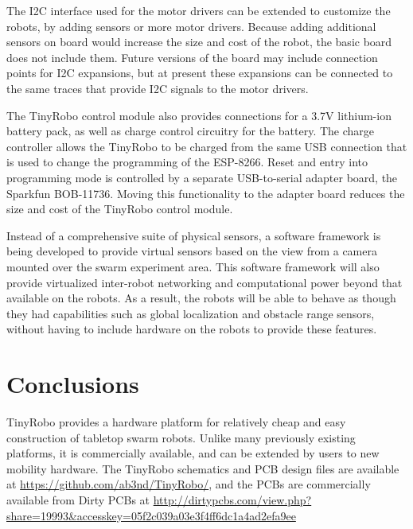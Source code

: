 \documentclass[letterpaper, 10 pt, conference]{ieeeconf}  %
\begin{document}
The I2C interface used for the motor drivers can be extended to customize the robots, by adding sensors or more motor drivers. 
Because adding additional sensors on board would increase the size and cost of the robot, the basic board does not include them. 
Future versions of the board may include connection points for I2C expansions, but at present these expansions can be connected to the same traces that provide I2C signals to the motor drivers. 

The TinyRobo control module also provides connections for a 3.7V lithium-ion battery pack, as well as charge control circuitry for the battery. 
The charge controller allows the TinyRobo to be charged from the same USB connection that is used to change the programming of the ESP-8266. 
Reset and entry into programming mode is controlled by a separate USB-to-serial adapter board, the Sparkfun BOB-11736.
Moving this functionality to the adapter board reduces the size and cost of the TinyRobo control module. 

Instead of a comprehensive suite of physical sensors, a software framework is being developed to provide virtual sensors based on the view from a camera mounted over the swarm experiment area.
This software framework will also provide virtualized inter-robot networking and computational power beyond that available on the robots. 
As a result, the robots will be able to behave as though they had capabilities such as global localization and obstacle range sensors, without having to include hardware on the robots to provide these features. 

\section{Conclusions}

TinyRobo provides a hardware platform for relatively cheap and easy construction of tabletop swarm robots.
Unlike many previously existing platforms, it is commercially available, and can be extended by users to new mobility hardware. 
The TinyRobo schematics and PCB design files are available at \url{https://github.com/ab3nd/TinyRobo/}, and the PCBs are commercially available from Dirty PCBs at \url{http://dirtypcbs.com/view.php?share=19993&accesskey=05f2c039a03e3f4ff6dc1a4ad2efa9ee}


\end{document}
